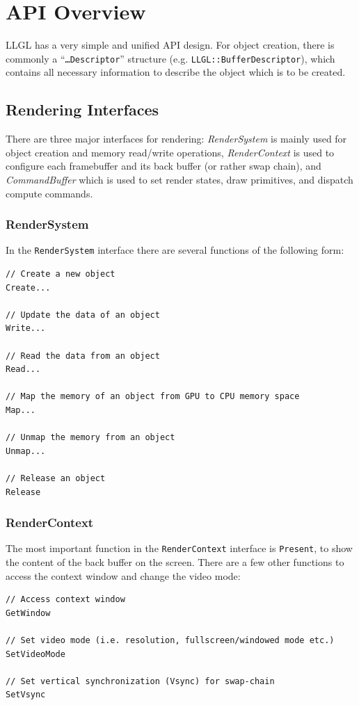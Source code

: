 \documentclass{article}
\begin{document}
\newpage
\section{API Overview}

LLGL has a very simple and unified API design.
For object creation, there is commonly a ``\texttt{\dots Descriptor}'' structure (e.g. \texttt{LLGL::BufferDescriptor}),
which contains all necessary information to describe the object which is to be created.

\subsection{Rendering Interfaces}

There are three major interfaces for rendering:
\emph{RenderSystem} is mainly used for object creation and memory read/write operations,
\emph{RenderContext} is used to configure each framebuffer and its back buffer (or rather swap chain),
and \emph{CommandBuffer} which is used to set render states, draw primitives, and dispatch compute commands.

\subsubsection{RenderSystem}

In the \texttt{RenderSystem} interface there are several functions of the following form:
\begin{lstlisting}
// Create a new object
Create...

// Update the data of an object
Write...

// Read the data from an object
Read...

// Map the memory of an object from GPU to CPU memory space
Map...

// Unmap the memory from an object
Unmap...

// Release an object
Release
\end{lstlisting}

\subsubsection{RenderContext}

The most important function in the \texttt{RenderContext} interface is \texttt{Present},
to show the content of the back buffer on the screen.
There are a few other functions to access the context window and change the video mode:
\begin{lstlisting}
// Access context window
GetWindow

// Set video mode (i.e. resolution, fullscreen/windowed mode etc.)
SetVideoMode

// Set vertical synchronization (Vsync) for swap-chain
SetVsync
\end{lstlisting}
\end{document}
